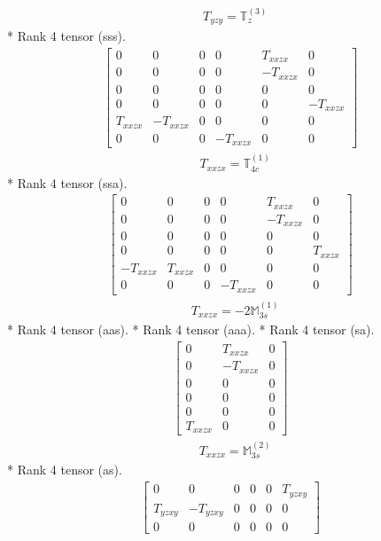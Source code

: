 \documentclass[fleqn,8pt,landscape]{jsarticle}
\begin{document}
\begin{align*}
& T_{yzy} = \mathbb{T}_{z}^{(3)}
\end{align*}
* Rank 4 tensor (sss).
\begin{align*}
\begin{bmatrix} 0 & 0 & 0 & 0 & T_{xxzx} & 0 \\ 0 & 0 & 0 & 0 & - T_{xxzx} & 0 \\ 0 & 0 & 0 & 0 & 0 & 0 \\ 0 & 0 & 0 & 0 & 0 & - T_{xxzx} \\ T_{xxzx} & - T_{xxzx} & 0 & 0 & 0 & 0 \\ 0 & 0 & 0 & - T_{xxzx} & 0 & 0 \end{bmatrix}
\end{align*}
\begin{align*}
& T_{xxzx} = \mathbb{T}_{4c}^{(1)}
\end{align*}
* Rank 4 tensor (ssa).
\begin{align*}
\begin{bmatrix} 0 & 0 & 0 & 0 & T_{xxzx} & 0 \\ 0 & 0 & 0 & 0 & - T_{xxzx} & 0 \\ 0 & 0 & 0 & 0 & 0 & 0 \\ 0 & 0 & 0 & 0 & 0 & T_{xxzx} \\ - T_{xxzx} & T_{xxzx} & 0 & 0 & 0 & 0 \\ 0 & 0 & 0 & - T_{xxzx} & 0 & 0 \end{bmatrix}
\end{align*}
\begin{align*}
& T_{xxzx} = - 2 \mathbb{M}_{3s}^{(1)}
\end{align*}
* Rank 4 tensor (aas).
* Rank 4 tensor (aaa).
* Rank 4 tensor (sa).
\begin{align*}
\begin{bmatrix} 0 & T_{xxzx} & 0 \\ 0 & - T_{xxzx} & 0 \\ 0 & 0 & 0 \\ 0 & 0 & 0 \\ 0 & 0 & 0 \\ T_{xxzx} & 0 & 0 \end{bmatrix}
\end{align*}
\begin{align*}
& T_{xxzx} = \mathbb{M}_{3s}^{(2)}
\end{align*}
* Rank 4 tensor (as).
\begin{align*}
\begin{bmatrix} 0 & 0 & 0 & 0 & 0 & T_{yzxy} \\ T_{yzxy} & - T_{yzxy} & 0 & 0 & 0 & 0 \\ 0 & 0 & 0 & 0 & 0 & 0 \end{bmatrix}
\end{align*}
\end{document}
